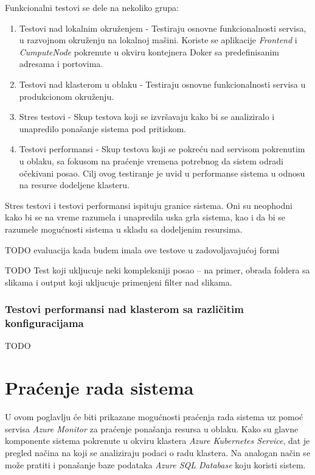 \documentclass[12pt,oneside]{memoir}
\begin{document}
Funkcionalni testovi se dele na nekoliko grupa:
\begin{enumerate}
\item Testovi nad lokalnim okruženjem - Testiraju osnovne funkcionalnosti servisa, u razvojnom okruženju na lokalnoj mašini. Koriste se aplikacije \emph{Frontend} i \emph{CumputeNode} pokrenute u okviru kontejnera Doker sa predefinisanim adresama i portovima.
\item Testovi nad klasterom u oblaku - Testiraju osnovne funkcionalnosti servisa u produkcionom okruženju.
\item Stres testovi - Skup testova koji se izvršavaju kako bi se analiziralo i unapredilo ponašanje sistema pod pritiskom. 
\item Testovi performansi - Skup testova koji se pokreću nad servisom pokrenutim u oblaku, sa fokusom na praćenje vremena potrebnog da sistem odradi očekivani posao. Cilj ovog testiranje je uvid u performanse sistema u odnosu na resurse dodeljene klasteru.
\end{enumerate}

Stres testovi i testovi performansi ispituju granice sistema. Oni su neophodni kako bi se na vreme razumela i unapredila uska grla sistema, kao i da bi se razumele mogućnosti sistema u skladu sa dodeljenim resursima.

TODO evaluacija kada budem imala ove testove u zadovoljavajućoj formi

TODO Test koji ukljucuje neki kompleksniji posao
-- na primer, obrada foldera sa slikama i output koji ukljucuje primenjeni filter nad slikama.

\subsubsection{Testovi performansi nad klasterom sa različitim konfiguracijama}
TODO


\section{Praćenje rada sistema}
\label{chp:pracenjemetrika}

U ovom poglavlju će biti prikazane mogućnosti praćenja rada sistema uz pomoć servisa \emph{Azure Monitor} za praćenje ponašanja resursa u oblaku. Kako su glavne komponente sistema pokrenute u okviru klastera \emph{Azure Kubernetes Service}, dat je pregled načina na koji se analiziraju podaci o radu klastera. Na analogan način se može pratiti i ponašanje baze podataka \emph{Azure SQL Database} koju koristi sistem.
\end{document}
